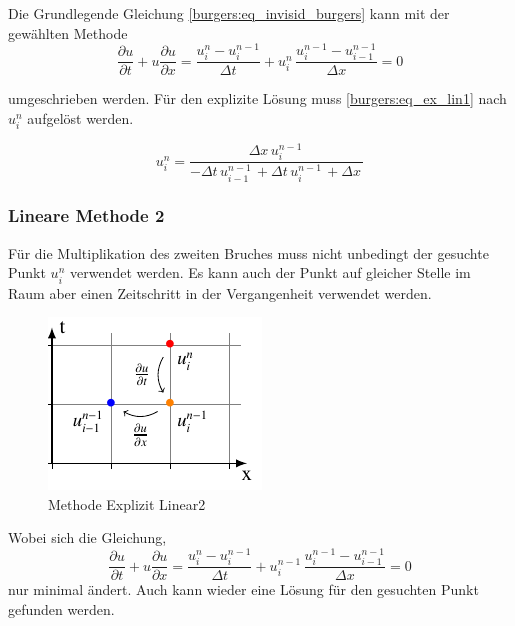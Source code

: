	Die Grundlegende Gleichung \ref{burgers:eq_invisid_burgers} kann mit der gewählten Methode
	\begin{equation}
	  	\frac {\partial u}{\partial t}+u{\frac {\partial u}{\partial x}} = \frac{u_{i}^{n}-u_{i}^{n-1}}{\Delta t}+ u_{i}^{n}\, \frac{u_{i}^{n-1}-u_{i-1}^{n-1}}{\Delta x}=0
	  	  \label{burgers:eq_ex_lin1}
	  	\end{equation}
	  	
	  	umgeschrieben werden.
	  	Für den explizite Lösung muss \ref{burgers:eq_ex_lin1} nach $ u_{i}^{n}$ aufgelöst werden.
	  	
	  	\begin{equation}
	  u_{i}^{n} = \frac{\Delta{x}\, u^{n-1}_{i}\,}{- \Delta{t}\, u^{n-1}_{i-1}\, + \Delta{t}\, u^{n-1}_{i}\, + \Delta{x}\,}
		  \label{burgers:eq_ex_sol_lin1}
	\end{equation}

	
	
\subsubsection{Lineare Methode 2}
	
	
	Für die Multiplikation des zweiten Bruches muss nicht unbedingt der gesuchte Punkt $u_{i}^{n}$ verwendet werden.
	Es kann auch der Punkt auf gleicher Stelle im Raum aber einen Zeitschritt in der Vergangenheit verwendet werden.
	
	
     \begin{figure}[!ht]
	\centering
	\includegraphics[height=.4\textwidth]{papers/burgers/BurgersEquation/tikz/Linear2/Linear2.pdf}
	\caption{Methode Explizit Linear2}
	\label{burgers:fig:Linear2}
	\end{figure}

	Wobei sich die Gleichung,
	\begin{equation}
			\frac {\partial u}{\partial t}+u{\frac {\partial u}{\partial x}} = \frac{u_{i}^{n}-u_{i}^{n-1}}{\Delta t}+ u_{i}^{n-1}\, \frac{u_{i}^{n-1}-u_{i-1}^{n-1}}{\Delta x}=0
		\label{burgers:eq_ex_lin2}
	\end{equation}
	 nur minimal ändert.
	 Auch kann wieder eine Lösung für den gesuchten Punkt gefunden werden.
	
